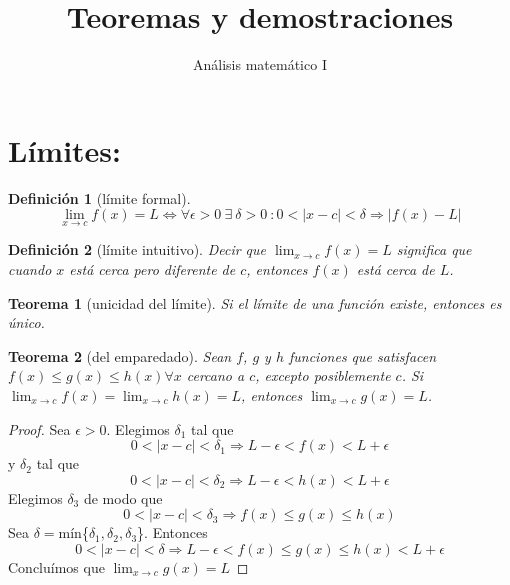 \documentclass{report}
\title{Teoremas y demostraciones}
\date{}
\author{Análisis matemático I}
\newtheorem*{theorem}{Teorema}
\newtheorem*{definition}{Definición}
\begin{document}
  \maketitle
  \listoftheorems
  \chapter*{Límites:} 
    \begin{definition}[límite formal]
      \begin{equation*}
        \lim_{x\to c}f(x)=L\iff\forall\epsilon>0 \ \exists\ \delta>0\ :0<|x-c|<\delta\Longrightarrow
        |f(x)-L| 
      \end{equation*}
    \end{definition}
    \begin{definition}[límite intuitivo]
      Decir que $\lim_{x\to c}f(x)=L$ significa  que cuando $x$ está cerca pero diferente de $c$,
      entonces $f(x)$ está cerca de $L$.
    \end{definition}
    \begin{theorem}[unicidad del límite]
      Si el límite de una función existe, entonces es único.
    \end{theorem}
    \begin{theorem}[del emparedado]
      Sean $f$, $g$ y $h$ funciones que satisfacen $f(x)\leqslant g(x)\leqslant h(x)\forall x$
      cercano a $c$, excepto posiblemente $c$. Si $\lim_{x\to c}f(x)=\lim_{x\to c}h(x)=L$, entonces
      $\lim_{x\to c}g(x)=L$.
    \end{theorem}
    \begin{proof}
      Sea $\epsilon>0$. Elegimos $\delta_1$ tal que
      \begin{equation*}
        0<|x-c|<\delta_1\Longrightarrow L-\epsilon<f(x)<L+\epsilon
      \end{equation*}
      y $\delta_2$ tal que
      \begin{equation*}
        0<|x-c|<\delta_2\Longrightarrow L-\epsilon<h(x)<L+\epsilon
      \end{equation*}
      Elegimos $\delta_3$ de modo que
      \begin{equation*}
        0<|x-c|<\delta_3\Longrightarrow f(x)\leqslant g(x)\leqslant h(x)
      \end{equation*}
      Sea $\delta=$mín\{$\delta_1,\delta_2,\delta_3$\}. Entonces
      \begin{equation*}
        0<|x-c|<\delta\Longrightarrow L-\epsilon<f(x)\leqslant g(x)\leqslant h(x)<L+\epsilon
      \end{equation*}
      Concluímos que $\lim_{x\to c}g(x)=L$
    \end{proof}
\end{document}
